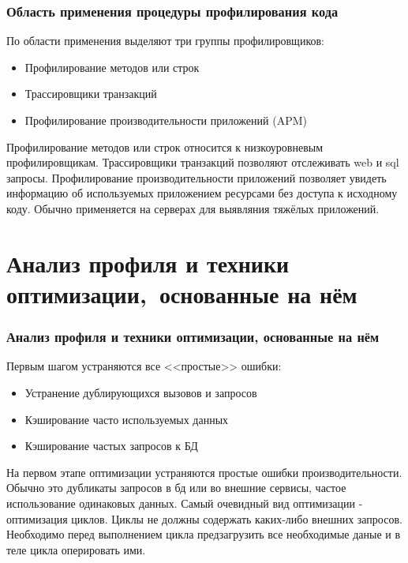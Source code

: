 \documentclass{../industrial-development}
\begin{document}
\begin{frame} \frametitle{Область применения процедуры профилирования кода}
	\begin{block}{}
		По области применения выделяют три группы профилировщиков:
	\end{block}
	
	\begin{itemize}
		\item Профилирование методов или строк
		\item Трассировщики транзакций
		\item Профилирование производительности приложений (APM)
	\end{itemize}
\end{frame}
\lecturenotes
Профилирование методов или строк относится к низкоуровневым профилировщикам. Трассировщики транзакций позволяют отслеживать web и sql запросы. Профилирование производительности приложений позволяет увидеть информацию об используемых приложением ресурсами без доступа к исходному коду. Обычно применяется на серверах для выявляния тяжёлых приложений.

\section{Анализ профиля и техники оптимизации,~основанные на нём}
\begin{frame} \frametitle{Анализ профиля и техники оптимизации, основанные на нём}
	\begin{block}{}
		Первым шагом устраняются все <<простые>> ошибки:
	\end{block}
	
	\begin{itemize}
		\item Устранение дублирующихся вызовов и запросов
		\item Кэширование часто используемых данных
		\item Кэширование частых запросов к БД
	\end{itemize}
\end{frame}
\lecturenotes
На первом этапе оптимизации устраняются простые ошибки производительности. Обычно это дубликаты запросов в бд или во внешние сервисы, частое использование одинаковых данных. Самый очевидный вид оптимизации - оптимизация циклов. Циклы не должны содержать каких-либо внешних запросов. Необходимо перед выполнением цикла предзагрузить все необходимые даные и в теле цикла оперировать ими.
\end{document}
